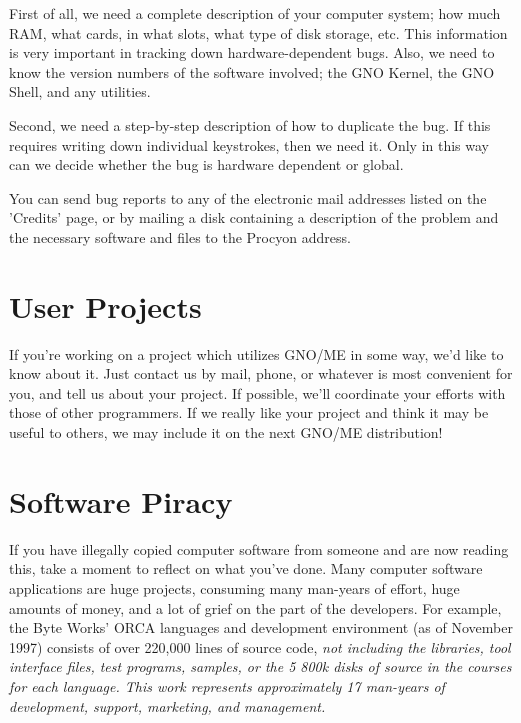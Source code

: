 First of all, we need a complete
description of your computer system; how much RAM, what cards, in
what slots, what type of disk storage, etc. This information is
very important in tracking down hardware-dependent bugs. Also, we
need to know the version numbers of the software involved; the
GNO Kernel, the GNO Shell, and any utilities.

Second, we need a step-by-step description
of how to duplicate the bug. If this requires writing down
individual keystrokes, then we need it. Only in this way can we
decide whether the bug is hardware dependent or global.

You can send bug reports to any of the
electronic mail addresses listed on the 'Credits' page, or by
mailing a disk containing a description of the problem and the
necessary software and files to the Procyon address.

\section{User Projects}

If you're working on a project which
utilizes GNO/ME in some way, we'd like to know about it. Just
contact us by mail, phone, or whatever is most convenient for
you, and tell us about your project. If possible, we'll
coordinate your efforts with those of other programmers. If we
really like your project and think it may be useful to others, we
may include it on the next GNO/ME distribution!

\section{Software Piracy}








If you have illegally copied computer software from someone
and are now reading this, take a moment to reflect on what you've done.
Many computer software applications are huge projects, consuming
many man-years of effort, huge amounts of money, and a lot of grief on the
part of the developers.
For example, the Byte Works' ORCA languages and development 
environment (as of November 1997) consists of over 220,000 lines
of source code, \em not \rm including the libraries, tool 
interface files, test programs, samples, or the 5 800k disks
of source in the courses for each language.  This work represents
approximately 17 man-years of development, support, marketing,
and management.


